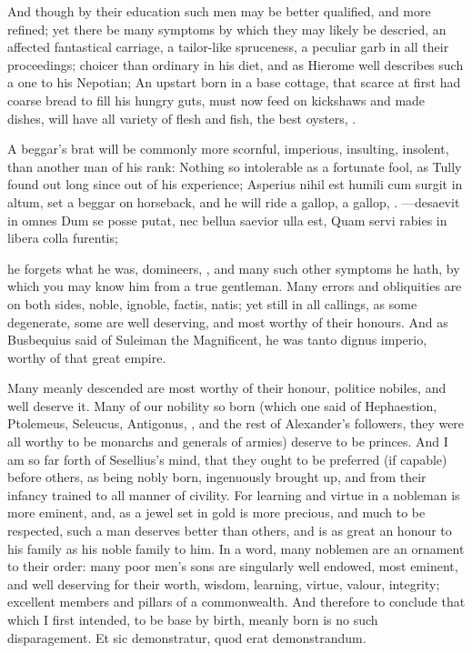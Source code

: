 {And though by their education such men may be better qualified, and
more refined; yet there be many symptoms by which they may likely be
descried, an affected fantastical carriage, a tailor-like spruceness, a
peculiar garb in all their proceedings; choicer than ordinary in his
diet, and as  Hierome well describes such a one to his Nepotian;
An upstart born in a base cottage, that scarce at first had coarse
bread to fill his hungry guts, must now feed on kickshaws and made
dishes, will have all variety of flesh and fish, the best oysters, \etc{}.

A beggar's brat will be commonly more scornful, imperious, insulting,
insolent, than another man of his rank: Nothing so intolerable as a
fortunate fool, as Tully found out long since out of his
experience; Asperius nihil est humili cum surgit in altum, set a beggar
on horseback, and he will ride a gallop, a gallop, \etc{}.
---desaevit in omnes
Dum se posse putat, nec bellua saevior ulla est,
Quam servi rabies in libera colla furentis;

he forgets what he was, domineers, \etc{}, and many such other symptoms he
hath, by which you may know him from a true gentleman. Many errors and
obliquities are on both sides, noble, ignoble, factis, natis; yet still
in all callings, as some degenerate, some are well deserving, and most
worthy of their honours. And as Busbequius said of Suleiman the
Magnificent, he was tanto dignus imperio, worthy of that great empire.

Many meanly descended are most worthy of their honour, politice
nobiles, and well deserve it. Many of our nobility so born (which one
said of Hephaestion, Ptolemeus, Seleucus, Antigonus, \etc{}, and the rest
of Alexander's followers, they were all worthy to be monarchs and
generals of armies) deserve to be princes. And I am so far forth of
Sesellius's mind, that they ought to be preferred (if capable)
before others, as being nobly born, ingenuously brought up, and from
their infancy trained to all manner of civility. For learning and
virtue in a nobleman is more eminent, and, as a jewel set in gold is
more precious, and much to be respected, such a man deserves better
than others, and is as great an honour to his family as his noble
family to him. In a word, many noblemen are an ornament to their order:
many poor men's sons are singularly well endowed, most eminent, and
well deserving for their worth, wisdom, learning, virtue, valour,
integrity; excellent members and pillars of a commonwealth. And
therefore to conclude that which I first intended, to be base by birth,
meanly born is no such disparagement. Et sic demonstratur, quod erat
demonstrandum.

}
